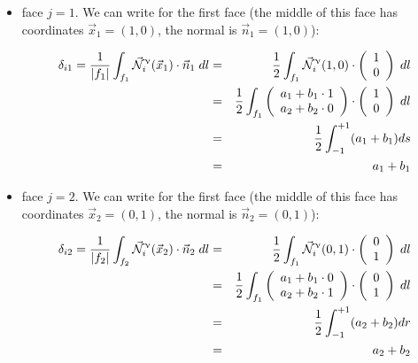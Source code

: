 \begin{itemize}
\item face $j=1$. We can write for the first face (the middle of this face has coordinates 
$\vec{x}_1=(1,0)$, the normal is $\vec{n}_1=(1,0)$):

\begin{eqnarray}
\delta_{i1}=
\frac{1}{|f_1|} \int_{f_1}
\vec{{\mathcal{N}}}^\upnu_i( \vec{x}_1) \cdot \vec{n}_1 \; dl
&=&\frac12  \int_{f_1} \vec{{\mathcal{N}}}^\upnu_i( 1,0) \cdot 
\left(\begin{array}{c} 1 \\ 0 \end{array}\right) \; dl \nonumber\\
&=& \frac12\int_{f_1} 
\left(\begin{array}{c} a_1+b_1\cdot 1 \\ a_2 + b_2 \cdot 0 \end{array}\right)
\cdot \left(\begin{array}{c} 1 \\ 0 \end{array}\right) \; dl \nonumber\\
&=& \frac12 \int_{-1}^{+1} (a_1+b_1) ds \nonumber\\
&=& a_1+b_1
\end{eqnarray}



\item face $j=2$. We can write for the first face (the middle of this face has coordinates 
$\vec{x}_2=(0,1)$, the normal is $\vec{n}_2=(0,1)$):

\begin{eqnarray}
\delta_{i2}=
\frac{1}{|f_2|} \int_{f_2}
\vec{{\mathcal{N}}}^\upnu_i( \vec{x}_2) \cdot \vec{n}_2 \; dl
&=&\frac12  \int_{f_1} \vec{{\mathcal{N}}}^\upnu_i( 0,1) \cdot 
\left(\begin{array}{c} 0 \\ 1 \end{array}\right) \; dl \nonumber\\
&=& \frac12\int_{f_1} 
\left(\begin{array}{c} a_1+b_1\cdot 0 \\ a_2 + b_2 \cdot 1 \end{array}\right)
\cdot \left(\begin{array}{c} 0 \\ 1 \end{array}\right) \; dl \nonumber\\
&=& \frac12 \int_{-1}^{+1} (a_2+b_2) dr \nonumber\\
&=& a_2+b_2
\end{eqnarray}



\end{itemize}
